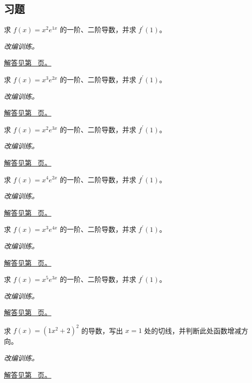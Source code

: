 \documentclass[12pt,fontset=fandol]{ctexart}
\begin{document}
\subsection{习题}
\begin{example}[多项式与指数的乘积]\label{ex:c8q1}
求 $f(x)=x^{2}e^{1x}$ 的一阶、二阶导数，并求 $f^{\prime}(1)$。
\par\textit{改编训练。}\par\hyperref[ans:c8q1]{解答见第~\pageref{ans:c8q1} 页。}
\end{example}
\begin{example}[多项式与指数的乘积]\label{ex:c8q2}
求 $f(x)=x^{3}e^{2x}$ 的一阶、二阶导数，并求 $f^{\prime}(1)$。
\par\textit{改编训练。}\par\hyperref[ans:c8q2]{解答见第~\pageref{ans:c8q2} 页。}
\end{example}
\begin{example}[多项式与指数的乘积]\label{ex:c8q3}
求 $f(x)=x^{2}e^{3x}$ 的一阶、二阶导数，并求 $f^{\prime}(1)$。
\par\textit{改编训练。}\par\hyperref[ans:c8q3]{解答见第~\pageref{ans:c8q3} 页。}
\end{example}
\begin{example}[多项式与指数的乘积]\label{ex:c8q4}
求 $f(x)=x^{4}e^{2x}$ 的一阶、二阶导数，并求 $f^{\prime}(1)$。
\par\textit{改编训练。}\par\hyperref[ans:c8q4]{解答见第~\pageref{ans:c8q4} 页。}
\end{example}
\begin{example}[多项式与指数的乘积]\label{ex:c8q5}
求 $f(x)=x^{3}e^{4x}$ 的一阶、二阶导数，并求 $f^{\prime}(1)$。
\par\textit{改编训练。}\par\hyperref[ans:c8q5]{解答见第~\pageref{ans:c8q5} 页。}
\end{example}
\begin{example}[多项式与指数的乘积]\label{ex:c8q6}
求 $f(x)=x^{5}e^{3x}$ 的一阶、二阶导数，并求 $f^{\prime}(1)$。
\par\textit{改编训练。}\par\hyperref[ans:c8q6]{解答见第~\pageref{ans:c8q6} 页。}
\end{example}
\begin{example}[幂函数的链式法则]\label{ex:c8q7}
求 $f(x)=(1x^2+2)^{2}$ 的导数，写出 $x=1$ 处的切线，并判断此处函数增减方向。
\par\textit{改编训练。}\par\hyperref[ans:c8q7]{解答见第~\pageref{ans:c8q7} 页。}
\end{example}
\end{document}
